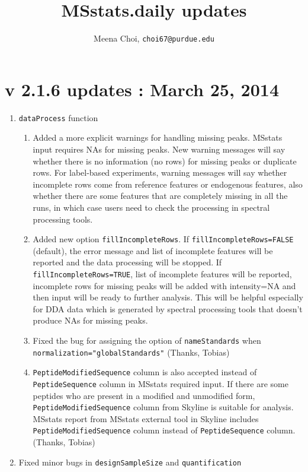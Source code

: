 \documentclass[10pt]{article}
\begin{document}
\noindent

\title{MSstats.daily updates}
\author{Meena Choi, {\tt choi67@purdue.edu}}
\maketitle



\section*{v 2.1.6 updates : March 25, 2014}
\begin{enumerate}
\item {\tt dataProcess} function
	\begin{enumerate}
	\item Added a more explicit warnings for handling missing peaks. MSstats input requires NAs for missing peaks. New warning messages will say whether there is no information (no rows) for missing peaks or duplicate rows. For label-based experiments, warning messages will say whether incomplete rows come from reference features or endogenous features, also whether there are some features that are completely missing in all the runs, in which case users need to check the processing in spectral processing tools.
	\item Added new option {\tt fillIncompleteRows}.   If {\tt fillIncompleteRows=FALSE} (default), the error message and list of incomplete features will be reported and the data processing will be stopped. If {\tt fillIncompleteRows=TRUE}, list of incomplete features will be reported, incomplete rows for missing peaks will be added with intensity=NA and then input will be ready to further analysis. This will be helpful especially for DDA data which is generated by spectral processing tools that doesn't produce NAs for missing peaks.
	\item Fixed the bug for assigning the option of {\tt nameStandards} when {\tt normalization="globalStandards"} (Thanks, Tobias)
	\item {\tt PeptideModifiedSequence} column is also accepted instead of {\tt PeptideSequence} column in MSstats required input. If there are some peptides who are present in a modified and unmodified form, {\tt PeptideModifiedSequence} column from Skyline is suitable for analysis. MSstats report from MSstats external tool in Skyline includes {\tt PeptideModifiedSequence} column instead of {\tt PeptideSequence} column. (Thanks, Tobias)
	\end{enumerate}

\item Fixed minor bugs in {\tt designSampleSize} and {\tt quantification}
\end{enumerate}
\end{document}

